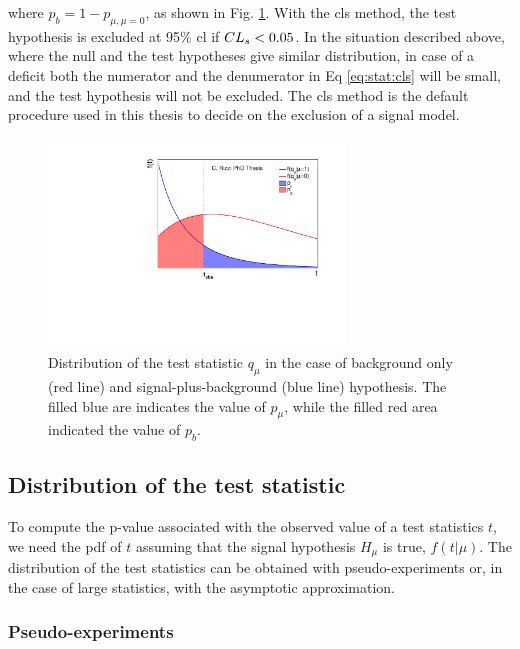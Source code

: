 \noindent where $p_b = 1 - p_{\mu, \mu=0}$, as shown in Fig. \ref{fig:stat:pmu_pb}. With the \gls{cls} method, the test hypothesis is excluded at 95\% \gls{cl} if $CL_s < 0.05$. In the situation described above, where the null and the test hypotheses give similar \qmu distribution, in case of a deficit both the numerator and the denumerator in Eq \ref{eq:stat:cls} will be small, and the test hypothesis will not be excluded. The \gls{cls} method is the default procedure used in this thesis to decide on the exclusion of a signal model. 


\begin{figure}
\centering
\includegraphics[width=0.7\textwidth]{produce_plots/stat/pmu_pb.pdf}
\caption{Distribution of the test statistic $q_\mu$ in the case of background only (red line) and signal-plus-background (blue line) hypothesis. The filled blue are indicates the value of $p_\mu$, while the filled red area indicated the value of $p_b$.}
\label{fig:stat:pmu_pb}
\end{figure}

\subsection{Distribution of the test statistic}

To compute the p-value associated with the observed value of a test statistics $t$, we need the \gls{pdf} of $t$ assuming that the signal hypothesis $H_\mu$ is true, $ f(t | \mu ) $. The distribution of the test statistics can be obtained with pseudo-experiments or, in the case of large statistics, with the asymptotic approximation. 

\subsubsection*{Pseudo-experiments}

